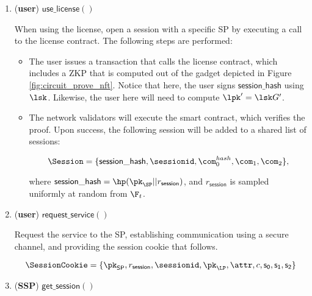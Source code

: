 \begin{enumerate}
\item (\textbf{user}) $\mathsf{use\_license()}$

	When using the license, open a session with a specific SP by executing a call to the license contract. The following steps are performed:
	
	
	\begin{itemize}
		\item The user issues a transaction that calls the license contract, which includes a ZKP that is computed out of the gadget depicted in Figure \ref{fig:circuit_prove_nft}. Notice that here, the user signs $\mathsf{session\_hash}$ using $\lsk$. Likewise, the user here will need to compute $\lpk' = \lsk G'$.
		\item The network validators will execute the smart contract, which verifies the proof. Upon success, the following session will be added to a shared list of sessions:
		
		$$\Session = \{\mathsf{session\_hash}, \sessionid, \com_0^{hash}, \com_1, \com_2\},$$
		
		where $\mathsf{session\_hash} = \hp(\pk_{\SP} || r_\mathsf{session})$, and $r_\mathsf{session}$ is sampled uniformly at random from $\F_t$.
		
		
	\end{itemize}
	
\item (\textbf{user}) $\mathsf{request\_service()}$

Request the service to the SP, establishing communication using a secure channel, and providing the session cookie that follows.
	
	$$\SessionCookie = \{\pk_{\mathsf{SP}}, r_\mathsf{session}, \sessionid, \pk_{\LP}, \attr, c, \mathsf{s_0}, \mathsf{s_1}, \mathsf{s_2}\}$$

	
\item (\textbf{SSP}) $\mathsf{get\_session()}$


\end{enumerate}
